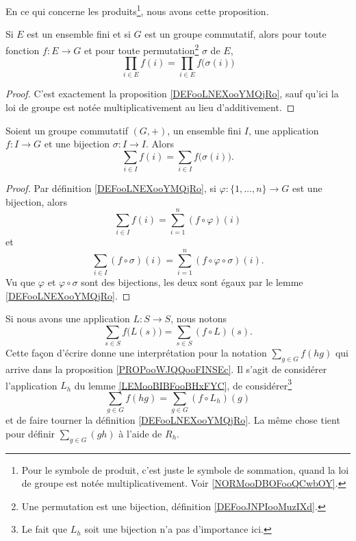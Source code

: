 En ce qui concerne les produits\footnote{Pour le symbole de produit, c'est juste le symbole de sommation, quand la loi de groupe est notée multiplicativement. Voir \ref{NORMooDBOFooQCwbOY}.}, nous avons cette proposition.
\begin{proposition}     \label{PROPooQMUDooQQVRIe}
	Si \( E\) est un ensemble fini et si \( G\) est un groupe commutatif, alors pour toute fonction \( f\colon E\to G\) et pour toute permutation\footnote{Une permutation est une bijection, définition \ref{DEFooJNPIooMuzIXd}.} \( \sigma\) de \( E\),
	\begin{equation}
		\prod_{i\in E}f(i)=\prod_{i\in E}f\big( \sigma(i) \big)
	\end{equation}
\end{proposition}

\begin{proof}
	C'est exactement la proposition \ref{DEFooLNEXooYMQjRo}, sauf qu'ici la loi de groupe est notée multiplicativement au lieu d'additivement.
\end{proof}


\begin{proposition}     \label{PROPooJBQVooNqWErk}
	Soient un groupe commutatif \( (G,+)\), un ensemble fini \( I\), une application \( f\colon I\to G\) et une bijection \( \sigma\colon I\to I\). Alors
	\begin{equation}
		\sum_{i\in I}f(i)=\sum_{i\in I}f\big( \sigma(i) \big).
	\end{equation}
\end{proposition}

\begin{proof}
	Par définition \ref{DEFooLNEXooYMQjRo}, si \(\varphi \colon \{ 1,\ldots,n \}\to G  \) est une bijection, alors
	\begin{equation}
		\sum_{i\in I}f(i)=\sum_{i=1}^n(f\circ\varphi)(i)
	\end{equation}
	et
	\begin{equation}
		\sum_{i\in I}(f\circ\sigma)(i)=\sum_{i=1}^n(f\circ\varphi\circ \sigma)(i).
	\end{equation}
	Vu que \( \varphi\) et \( \varphi\circ\sigma\) sont des bijections, les deux sont égaux par le lemme \ref{DEFooLNEXooYMQjRo}.
\end{proof}

Si nous avons une application \( L\colon S\to S\), nous notons
\begin{equation}
	\sum_{s\in S}f\big( L(s) \big)=\sum_{s\in S}(f\circ L)(s).
\end{equation}
Cette façon d'écrire donne une interprétation pour la notation \( \sum_{g\in G}f(hg)\) qui arrive dans la proposition \ref{PROPooWJQQooFINSEc}. Il s'agit de considérer l'application \( L_h\) du lemme \ref{LEMooBIBFooBHxFYC}, de considérer\footnote{Le fait que \( L_h\) soit une bijection n'a pas d'importance ici.}
\begin{equation}        \label{EQooQQBEooFDOBVG}
	\sum_{g\in G}f(hg)=\sum_{g\in G}(f\circ L_h)(g)
\end{equation}
et de faire tourner la définition \ref{DEFooLNEXooYMQjRo}. La même chose tient pour définir \( \sum_{g\in G}(gh)\) à l'aide de \( R_h\).


